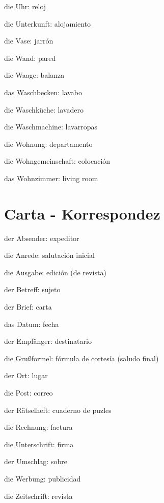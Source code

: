 \begin{multicols}{2}
\begin{myitemize}
\item die Uhr: reloj
\item die Unterkunft: alojamiento
\item die Vase: jarrón
\item die Wand: pared
\item die Waage: balanza
\item das Waschbecken: lavabo
\item die Waschküche: lavadero
\item die Waschmachine: lavarropas
\item die Wohnung: departamento
\item die Wohngemeinschaft: colocación
\item das Wohnzimmer: living room 
\end{myitemize}
\end{multicols}

\section{Carta - Korrespondez}
\begin{multicols}{2}
\begin{myitemize}
\item der Absender: expeditor
\item die Anrede: salutación inicial
\item die Ausgabe: edición (de revista)
\item der Betreff: sujeto
\item der Brief: carta
\item das Datum: fecha
\item der Empfänger: destinatario
\item die Grußformel: fórmula de cortesía (saludo final)
\item der Ort: lugar
\item die Post: correo
\item der Rätselheft: cuaderno de puzles
\item die Rechnung: factura
\item die Unterschrift: firma
\item der Umschlag: sobre
\item die Werbung: publicidad
\item die Zeitschrift: revista
\end{myitemize}
\end{multicols}

